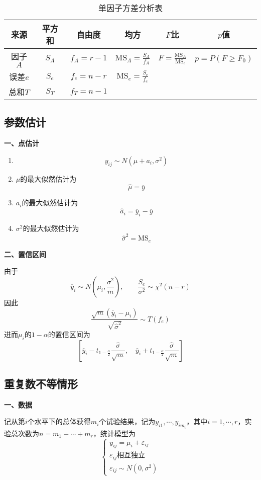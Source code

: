 \documentclass[lang = cn, scheme = chinese, thmcnt = section]{elegantbook}
\begin{document}
\begin{table}[H]
	\centering
	\caption{单因子方差分析表}
	\begin{tabular}{|c|c|c|c|c|c|}
		\hline
		来源 & 平方和 & 自由度 & 均方 & $F$比 & $p$值 \\ \hline
		因子$A$ & $S_A$ & $f_A=r-1$ & $\mathrm{MS}_A=\frac{S_A}{f_A}$ & $F=\frac{\mathrm{MS}_A}{\mathrm{MS}_e}$ & $p=P(F\ge F_0)$ \\ \hline
		误差$e$ & $S_e$ & $f_e=n-r$ & $\mathrm{MS}_e=\frac{S_e}{f_e}$ & & \\ \hline
		总和$T$ & $S_T$ & $f_T=n-1$ & & & \\ \hline
	\end{tabular}
\end{table}

\subsection{参数估计}

\textbf{一、点估计}

\begin{enumerate}
	\item 
	$$
	y_{ij}\sim N(\mu+a_i,\sigma^2)
	$$
	\item $\mu$的最大似然估计为
	$$
	\hat{\mu}=\overline{y}
	$$
	\item $a_i$的最大似然估计为
	$$
	\hat{a}_i=\overline{y}_i-\overline{y}
	$$
	\item $\sigma^2$的最大似然估计为
	$$
	\hat{\sigma}^2=\mathrm{MS}_e
	$$
\end{enumerate}

\textbf{二、置信区间}

由于
$$
\overline{y}_i\sim N(\mu_i,\frac{\sigma^2}{m}),\qquad
\frac{S_e}{\sigma^2}\sim\chi^2(n-r)
$$
因此
$$
\frac{\sqrt{m}(\overline{y}_i-\mu_i)}{\sqrt{\hat{\sigma}^2}}\sim T(f_e)
$$
进而$\mu_i$的$1-\alpha$的置信区间为
$$
\left[
\overline{y}_i-t_{1-\frac{\alpha}{2}}\frac{\hat{\sigma}}{\sqrt{m}},\quad
\overline{y}_i+t_{1-\frac{\alpha}{2}}\frac{\hat{\sigma}}{\sqrt{m}}
\right]
$$

\subsection{重复数不等情形}

\textbf{一、数据}

记从第$i$个水平下的总体获得$m_i$个试验结果，记为$y_{i1},\cdots,y_{im_i}$，其中$i=1,\cdots,r$，实验总次数为$n=m_1+\cdots+m_r$，统计模型为
$$
\begin{cases}
	y_{ij}=\mu_i+\varepsilon_{ij}\\
	\varepsilon_{ij}\textbf{相互独立}\\
	\varepsilon_{ij}\sim N(0,\sigma^2)
\end{cases}
$$
\end{document}
